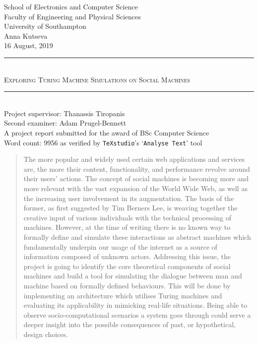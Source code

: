 \documentclass[12pt]{article}
\begin{document}
	\begin{titlepage}
		\newcommand{\HRule}{\rule{\linewidth}{0.5mm}}
		\center
		\Large School of Electronics and Computer Science\\
		\Large Faculty of Engineering and Physical Sciences\\
		\Large University of Southampton\\[1.5cm]
		\Huge Anna Kutseva\\
		{\large 16 August, 2019}\\[3cm]
		\HRule \\[0.4cm]
		\textsc{{\huge Exploring Turing Machine Simulations on Social Machines }}\\[0.3cm]
		\HRule \\[1.5cm]
		\LARGE Project supervisor: Thanassis Tiropanis \\
		\LARGE Second examiner: Adam Prugel-Bennett \\[1.5cm]
		\Large A project report submitted for the award of BSc Computer Science \\[1.5cm]
		{\small Word count: 9956 as verified by \texttt{TeXstudio}'s `\texttt{Analyse Text}' tool}
	\end{titlepage}
	\tableofcontents
	\thispagestyle{empty}
	\newpage\vspace*{\fill}
	\begin{abstract}
	 	The more popular and widely used certain web applications and services are, the more their content, functionality, and performance revolve around their users' actions.
		The concept of social machines is becoming more and more relevant with the vast expansion of the World Wide Web, as well as the increasing user involvement in its augmentation. The basis of the former, as first suggested by Tim Berners Lee, is weaving together the creative input of various individuals with the technical processing of machines.
		However, at the time of writing there is no known way to formally define and simulate these interactions as abstract machines which fundamentally underpin our usage of the internet as a source of information composed of unknown actors. Addressing this issue, the project is going to identify the core theoretical components of social machines and build a tool for simulating the dialogue between man and machine based on formally defined behaviours.
		This will be done by implementing an architecture which utilises Turing machines and evaluating its applicability in mimicking real-life situations.
		Being able to observe socio-computational scenarios a system goes through could serve a deeper insight into the possible consequences of past, or hypothetical, design choices.
	\end{abstract}\vspace*{\fill}
\end{document}
